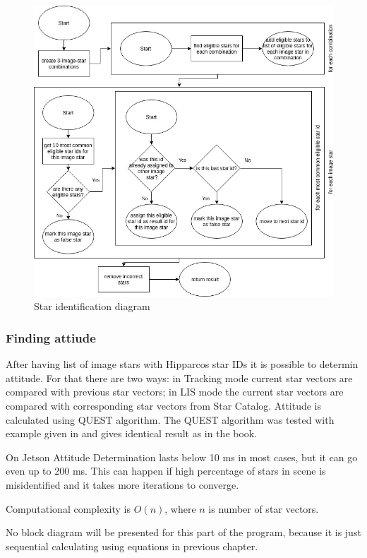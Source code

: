 \documentclass[12pt,a4paper,twoside]{article}
\begin{document}
\begin{figure}[!htbp]
\includegraphics[scale=0.55]{star_identifier_diagram.jpg}
\centering
\caption{Star identification diagram}
\label{fig:star_identifier_diagram}
\end{figure}


\subsubsection{Finding attiude}
After having list of image stars with Hipparcos star IDs it is possible to determin attitude. For that there are two ways: in Tracking mode current star vectors are compared with previous star vectors; in LIS mode the current star vectors are compared with corresponding star vectors from Star Catalog. Attitude is calculated using QUEST algorithm. The QUEST algorithm was tested with example given in\cite{hall2003spacecraft} and gives identical result as in the book.

On Jetson Attitude Determination lasts below 10 ms in most cases, but it can go even up to 200 ms. This can happen if high percentage of stars in scene is misidentified and it takes more iterations to converge.

Computational complexity is $O(n)$, where $n$ is number of star vectors.

No block diagram will be presented for this part of the program, because it is just sequential calculating using equations in previous chapter.
\end{document}
